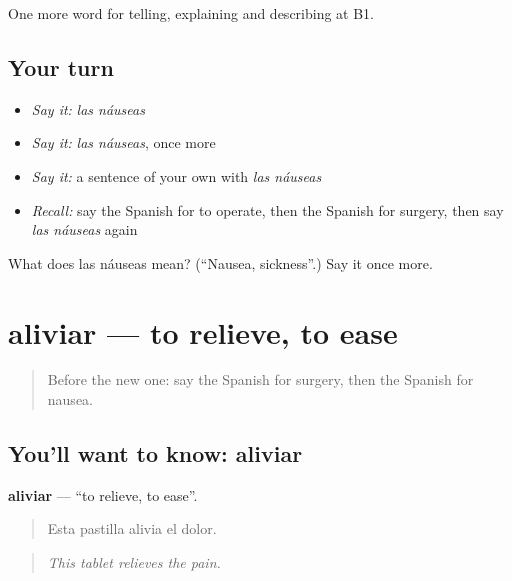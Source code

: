 \begin{grammarlens}[title={What you've built}]
One more word for telling, explaining and describing at B1.
\end{grammarlens}

\subsection*{Your turn}
\begin{itemize}
\raggedright
  \item \emph{Say it:} \emph{las náuseas}
  \item \emph{Say it:} \emph{las náuseas}, once more
  \item \emph{Say it:} a sentence of your own with \emph{las náuseas}
  \item \emph{Recall:} say the Spanish for to operate, then the Spanish for surgery, then say \emph{las náuseas} again
\end{itemize}

\begin{tcolorbox}[breakable,colback=teal!4,colframe=teal!35!black,title={Before you move on}]
What does las náuseas mean? (\textquotedblleft{}Nausea, sickness\textquotedblright{}.) Say it once more.
\end{tcolorbox}
\section[aliviar]{aliviar — to relieve, to ease}

\label{lesson:ES-C740-aliviar}



\begin{quote}
Before the new one: say the Spanish for surgery, then the Spanish for nausea.
\end{quote}

\subsection*{You'll want to know: aliviar}
\textbf{aliviar} — \textquotedblleft{}to relieve, to ease\textquotedblright{}.

\begin{quote}
Esta pastilla alivia el dolor.
\end{quote}

\begin{quote}
\emph{This tablet relieves the pain.}
\end{quote}

